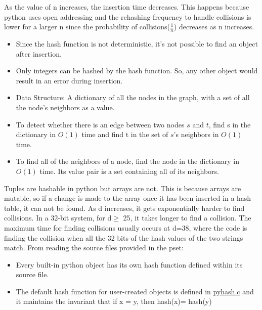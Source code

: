 \documentclass[12pt,twoside]{article}
\begin{document}
\begin{problems}
\begin{problemparts}
\problempart As the value of n increases, the insertion time decreases. This happens because python uses open addressing and the rehashing frequency to handle collisions is lower for a larger n since the probability of collisions($ \frac{1}{n} $) decreases as n increases. 
\problempart \begin{itemize}
	\item Since the hash function is not deterministic, it's not possible to find an object after insertion.
	\item Only integers can be hashed by the hash function. So, any other object would result in an error during insertion. 
\end{itemize}
\problempart 
\begin{itemize}
	\item Data Structure: A dictionary of all the nodes in the graph, with a set of all the node's neighbors as a value. 
	\item To detect whether there is an edge between two nodes $ s $ and $ t $, find s in the dictionary in $ O(1) $ time and find t in the set of $ s $'s neighbors in $ O(1) $ time.
	\item To find all of the neighbors of a node, find the node in the dictionary in $ O(1) $ time. Its value pair is a set containing all of its neighbors.
\end{itemize}
\problempart Tuples are hashable in python but arrays are not. This is because arrays are mutable, so if a change is made to the array once it has been inserted in a hash table, it can not be found. 
\problempart As d increases, it gets exponentially harder to find collisions. In a 32-bit system, for d$\geq$ 25, it takes longer to find a collision. The maximum time for finding collisions usually occurs at d=38, where the code is finding the collision when all the 32 bits of the hash values of the two strings match. 
\problempart From reading the source files provided in the pset:
\begin{itemize}
	\item Every built-in python object has its own hash function defined within its source file.
	\item The default hash function for user-created objects is defined in \href{https://github.com/python/cpython/blob/master/Python/pyhash.c}{pyhash.c} and it maintains the invariant that if x = y, then hash(x)= hash(y) 
\end{itemize} 
\end{problemparts}



\end{problems}
\end{document}

